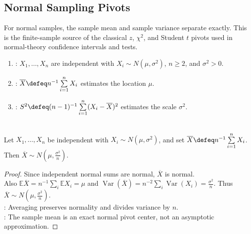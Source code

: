 \subsection{Normal Sampling Pivots}

For normal samples, the sample mean and sample variance separate exactly.  This is the finite-sample source of the classical $z$, $\chi^2$, and Student $t$ pivots used in normal-theory confidence intervals and tests.

\begin{definition} \label{def:normal-sample-mean-variance} 
\begin{enumerate}[label=(\roman*)]
\setlength{\itemsep}{0pt}
\item {}: $X_1,\ldots,X_n$ are independent with $X_i\sim N(\mu,\sigma^2)$, $n\geq2$, and $\sigma^2>0$.
\item {}: $\overline{X}\defeq n^{-1}\sum\limits_{i=1}^nX_i$ estimates the location $\mu$.
\item {}: $S^2\defeq(n-1)^{-1}\sum\limits_{i=1}^n(X_i-\overline{X})^2$ estimates the scale $\sigma^2$.
\end{enumerate}
\end{definition}

\begin{proposition} \label{prop:normal-sample-mean-law} \\
Let $X_1,\ldots,X_n$ be independent with $X_i\sim N(\mu,\sigma^2)$, and set $\overline{X}\defeq n^{-1}\sum\limits_{i=1}^nX_i$. Then $\overline{X}\sim N(\mu,\frac{\sigma^2}{n})$.
\begin{proof} Since independent normal sums are normal, $\overline{X}$ is normal.\\
Also $\mathbb{E}\overline{X}=n^{-1}\sum\limits_i\mathbb{E}X_i=\mu$ and $\operatorname{Var}(\overline{X})=n^{-2}\sum\limits_i\operatorname{Var}(X_i)=\frac{\sigma^2}{n}$. Thus $\overline{X}\sim N(\mu,\frac{\sigma^2}{n})$.\\
: Averaging preserves normality and divides variance by $n$.\\
: The sample mean is an exact normal pivot center, not an asymptotic approximation.
\end{proof}
\end{proposition}

